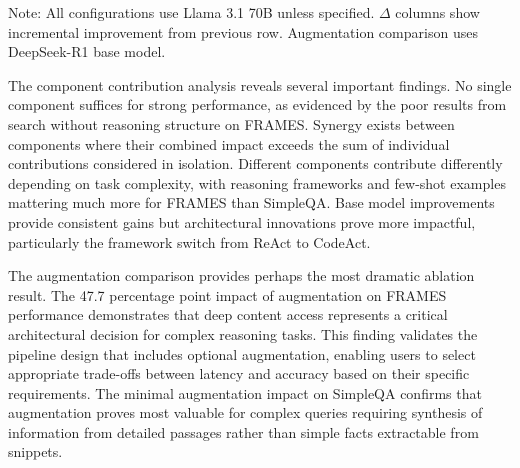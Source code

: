 \begin{table}[htbp]
\centering
\caption{Ablation Study: Component Contributions to System Performance}
\label{tab:ablation_study}
\begin{tablenotes}
\small
\item Note: All configurations use Llama 3.1 70B unless specified. $\Delta$ columns show incremental improvement from previous row. Augmentation comparison uses DeepSeek-R1 base model.
\end{tablenotes}
\end{table}


The component contribution analysis reveals several important findings. No single component suffices for strong performance, as evidenced by the poor results from search without reasoning structure on FRAMES. Synergy exists between components where their combined impact exceeds the sum of individual contributions considered in isolation. Different components contribute differently depending on task complexity, with reasoning frameworks and few-shot examples mattering much more for FRAMES than SimpleQA. Base model improvements provide consistent gains but architectural innovations prove more impactful, particularly the framework switch from ReAct to CodeAct.

The augmentation comparison provides perhaps the most dramatic ablation result. The 47.7 percentage point impact of augmentation on FRAMES performance demonstrates that deep content access represents a critical architectural decision for complex reasoning tasks. This finding validates the pipeline design that includes optional augmentation, enabling users to select appropriate trade-offs between latency and accuracy based on their specific requirements. The minimal augmentation impact on SimpleQA confirms that augmentation proves most valuable for complex queries requiring synthesis of information from detailed passages rather than simple facts extractable from snippets.

